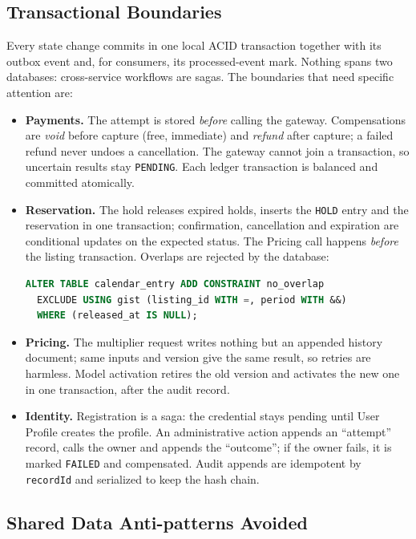 \subsection{Transactional Boundaries}

Every state change commits in one local ACID transaction together with its
outbox event and, for consumers, its processed-event mark. Nothing spans two
databases: cross-service workflows are sagas. The boundaries that need
specific attention are:
\begin{itemize}
  \item \textbf{Payments.} The attempt is stored \emph{before} calling the
    gateway. Compensations are \emph{void} before capture (free, immediate)
    and \emph{refund} after capture; a failed refund never undoes a
    cancellation. The gateway cannot join a transaction, so uncertain results
    stay \texttt{PENDING}. Each ledger transaction is balanced and committed
    atomically.
  \item \textbf{Reservation.} The hold releases expired holds, inserts the
    \texttt{HOLD} entry and the reservation in one transaction; confirmation,
    cancellation and expiration are conditional updates on the expected
    status. The Pricing call happens \emph{before} the listing transaction.
    Overlaps are rejected by the database:
\begin{lstlisting}[language=SQL, basicstyle=\ttfamily\footnotesize, frame=single]
ALTER TABLE calendar_entry ADD CONSTRAINT no_overlap
  EXCLUDE USING gist (listing_id WITH =, period WITH &&)
  WHERE (released_at IS NULL);
\end{lstlisting}
  \item \textbf{Pricing.} The multiplier request writes nothing but an
    appended history document; same inputs and version give the same result,
    so retries are harmless. Model activation retires the old version and
    activates the new one in one transaction, after the audit record.
  \item \textbf{Identity.} Registration is a saga: the credential stays
    pending until User Profile creates the profile. An administrative action
    appends an ``attempt'' record, calls the owner and appends the
    ``outcome''; if the owner fails, it is marked \texttt{FAILED} and
    compensated. Audit appends are idempotent by \texttt{recordId} and
    serialized to keep the hash chain.
\end{itemize}

\subsection{Shared Data Anti-patterns Avoided}

